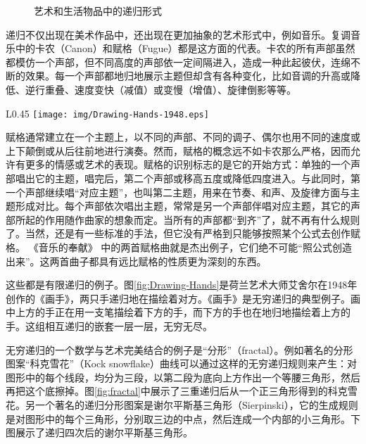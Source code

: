 \documentclass{article}
\begin{document}
\begin{figure}[htbp]
 \centering
  \hspace{.01\textwidth}
 \caption{艺术和生活物品中的递归形式}
 \label{fig:flower}
\end{figure}

递归不仅出现在美术作品中，还出现在更加抽象的艺术形式中，例如音乐。复调音乐中的卡农（Canon）和赋格（Fugue）都是这方面的代表。卡农的所有声部虽然都模仿一个声部，但不同高度的声部依一定间隔进入，造成一种此起彼伏，连绵不断的效果。每一个声部都地归地展示主题但却含有各种变化，比如音调的升高或降低、逆行重叠、速度变快（减值）或变慢（增值）、旋律倒影等等。

\begin{wrapfigure}{L}{0.45\textwidth}
 \centering
 \texttt{[image: img/Drawing-Hands-1948.eps]}
 \caption{艾舍尔的作品《画手》，1948年}
 \label{fig:Drawing-Hands}
\end{wrapfigure}

赋格通常建立在一个主题上，以不同的声部、不同的调子、偶尔也用不同的速度或上下颠倒或从后往前地进行演奏。然而，赋格的概念远不如卡农那么严格，因而允许有更多的情感或艺术的表现。赋格的识别标志的是它的开始方式：单独的一个声部唱出它的主题，唱完后，第二个声部或移高五度或降低四度进入。与此同时，第一个声部继续唱“对应主题”，也叫第二主题，用来在节奏、和声、及旋律方面与主题形成对比。每个声部依次唱出主题，常常是另一个声部伴唱对应主题，其它的声部所起的作用随作曲家的想象而定。当所有的声部都“到齐”了，就不再有什么规则了。当然，还是有一些标准的手法，但它没有严格到只能够按照某个公式去创作赋格。 《音乐的奉献》 中的两首赋格曲就是杰出例子，它们绝不可能“照公式创造出来”。这两首曲子都具有远比赋格的性质更为深刻的东西\cite{GEB}。

这些都是有限递归的例子。图\ref{fig:Drawing-Hands}是荷兰艺术大师艾舍尔在1948年创作的《画手》，两只手递归地在描绘着对方。《画手》是无穷递归的典型例子。画中上方的手正在用一支笔描绘着下方的手，而下方的手也在地归地描绘着上方的手。这组相互递归的嵌套一层一层，无穷无尽。

无穷递归的一个数学与艺术完美结合的例子是“分形”（fractal）。例如著名的分形图案“科克雪花”（Kock snowflake）曲线可以通过这样的无穷递归规则来产生：对图形中的每个线段，均分为三段，以第二段为底向上方作出一个等腰三角形，然后再把这个底擦掉。图\ref{fig:fractal}中展示了三重递归后从一个正三角形得到的科克雪花。另一个著名的递归分形图案是谢尔平斯基三角形（Sierpinski），它的生成规则是对图形中的每个三角形，分别取三边的中点，然后连成一个内部的小三角形。下图展示了递归四次后的谢尔平斯基三角形。
\end{document}
